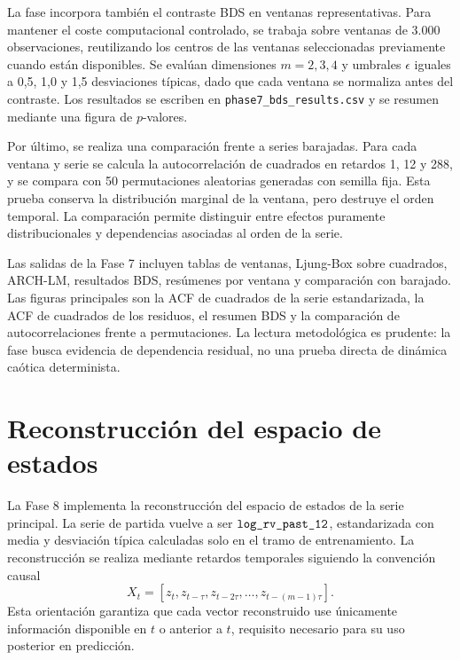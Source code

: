 La fase incorpora también el contraste BDS en ventanas representativas. Para mantener el coste computacional controlado, se trabaja sobre ventanas de 3.000 observaciones, reutilizando los centros de las ventanas seleccionadas previamente cuando están disponibles. Se evalúan dimensiones \(m=2,3,4\) y umbrales \(\epsilon\) iguales a 0,5, 1,0 y 1,5 desviaciones típicas, dado que cada ventana se normaliza antes del contraste. Los resultados se escriben en \texttt{phase7\_\allowbreak bds\_\allowbreak results.csv} y se resumen mediante una figura de \(p\)-valores.

Por último, se realiza una comparación frente a series barajadas. Para cada ventana y serie se calcula la autocorrelación de cuadrados en retardos 1, 12 y 288, y se compara con 50 permutaciones aleatorias generadas con semilla fija. Esta prueba conserva la distribución marginal de la ventana, pero destruye el orden temporal. La comparación permite distinguir entre efectos puramente distribucionales y dependencias asociadas al orden de la serie.

Las salidas de la Fase 7 incluyen tablas de ventanas, Ljung-Box sobre cuadrados, ARCH-LM, resultados BDS, resúmenes por ventana y comparación con barajado. Las figuras principales son la ACF de cuadrados de la serie estandarizada, la ACF de cuadrados de los residuos, el resumen BDS y la comparación de autocorrelaciones frente a permutaciones. La lectura metodológica es prudente: la fase busca evidencia de dependencia residual, no una prueba directa de dinámica caótica determinista.

\section{Reconstrucción del espacio de estados}\label{sec:implementacion-reconstruccion}

La Fase 8 implementa la reconstrucción del espacio de estados de la serie principal. La serie de partida vuelve a ser \(\texttt{log\_\allowbreak rv\_\allowbreak past\_\allowbreak 12}\), estandarizada con media y desviación típica calculadas solo en el tramo de entrenamiento. La reconstrucción se realiza mediante retardos temporales siguiendo la convención causal
\begin{equation}
    X_t = [z_t, z_{t-\tau}, z_{t-2\tau}, \ldots, z_{t-(m-1)\tau}].
\end{equation}
Esta orientación garantiza que cada vector reconstruido use únicamente información disponible en \(t\) o anterior a \(t\), requisito necesario para su uso posterior en predicción.

